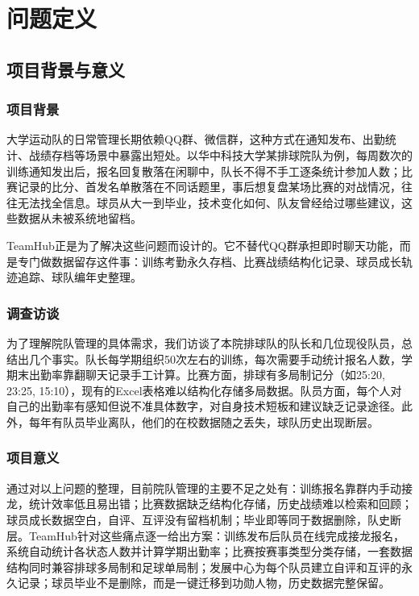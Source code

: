 \documentclass[12pt,a4paper]{ctexart}
\begin{document}
\section{问题定义}

\subsection{项目背景与意义}

\subsubsection{项目背景}

大学运动队的日常管理长期依赖QQ群、微信群，这种方式在通知发布、出勤统计、战绩存档等场景中暴露出短处。以华中科技大学某排球院队为例，每周数次的训练通知发出后，报名回复散落在闲聊中，队长不得不手工逐条统计参加人数；比赛记录的比分、首发名单散落在不同话题里，事后想复盘某场比赛的对战情况，往往无法找全信息。球员从大一到毕业，技术变化如何、队友曾经给过哪些建议，这些数据从未被系统地留档。

TeamHub正是为了解决这些问题而设计的。它不替代QQ群承担即时聊天功能，而是专门做数据留存这件事：训练考勤永久存档、比赛战绩结构化记录、球员成长轨迹追踪、球队编年史整理。

\subsubsection{调查访谈}

为了理解院队管理的具体需求，我们访谈了本院排球队的队长和几位现役队员，总结出几个事实。队长每学期组织50次左右的训练，每次需要手动统计报名人数，学期末出勤率靠翻聊天记录手工计算。比赛方面，排球有多局制记分（如25:20, 23:25, 15:10），现有的Excel表格难以结构化存储多局数据。队员方面，每个人对自己的出勤率有感知但说不准具体数字，对自身技术短板和建议缺乏记录途径。此外，每年有队员毕业离队，他们的在校数据随之丢失，球队历史出现断层。

\subsubsection{项目意义}

通过对以上问题的整理，目前院队管理的主要不足之处有：训练报名靠群内手动接龙，统计效率低且易出错；比赛数据缺乏结构化存储，历史战绩难以检索和回顾；球员成长数据空白，自评、互评没有留档机制；毕业即等同于数据删除，队史断层。TeamHub针对这些痛点逐一给出方案：训练发布后队员在线完成接龙报名，系统自动统计各状态人数并计算学期出勤率；比赛按赛事类型分类存储，一套数据结构同时兼容排球多局制和足球单局制；发展中心为每个队员建立自评和互评的永久记录；球员毕业不是删除，而是一键迁移到功勋人物，历史数据完整保留。
\end{document}
